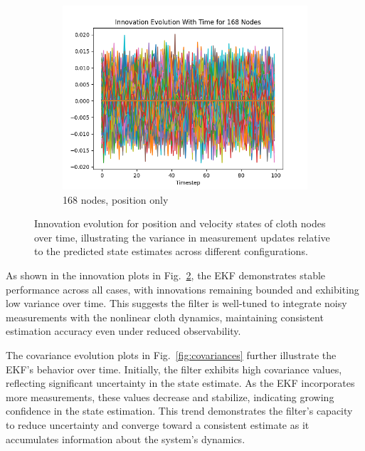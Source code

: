 \begin{figure}[ht]
    \hfill %
    \begin{subfigure}[b]{0.32\linewidth}
        \includegraphics[width=\linewidth]{CLOTH REPORT PICS/innovation 168.jpg}
        \caption{168 nodes, position only}
        \label{fig:innovation-168}
    \end{subfigure}
    \caption{Innovation evolution for position and velocity states of cloth nodes over time, illustrating the variance in measurement updates relative to the predicted state estimates across different configurations.}
    \label{fig:innovations}
\end{figure}

As shown in the innovation plots in Fig.~\ref{fig:innovations}, the EKF demonstrates stable performance across all cases, with innovations remaining bounded and exhibiting low variance over time. This suggests the filter is well-tuned to integrate noisy measurements with the nonlinear cloth dynamics, maintaining consistent estimation accuracy even under reduced observability.

The covariance evolution plots in Fig.~\ref{fig:covariances} further illustrate the EKF’s behavior over time. Initially, the filter exhibits high covariance values, reflecting significant uncertainty in the state estimate. As the EKF incorporates more measurements, these values decrease and stabilize, indicating growing confidence in the state estimation. This trend demonstrates the filter’s capacity to reduce uncertainty and converge toward a consistent estimate as it accumulates information about the system’s dynamics.

